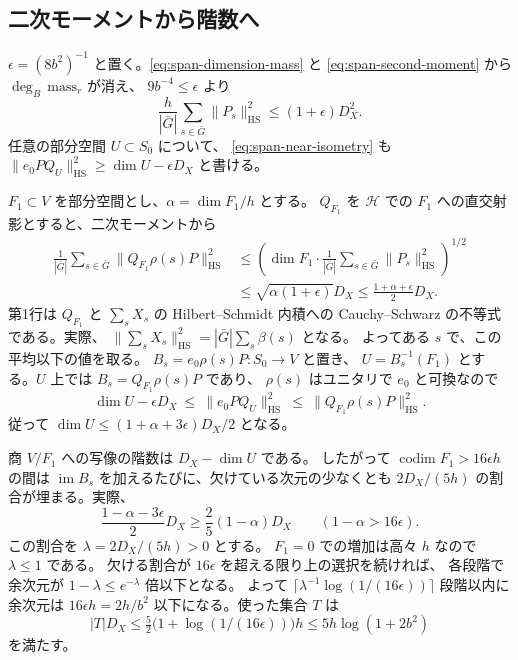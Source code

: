 \subsection{二次モーメントから階数へ}

\(\epsilon=(8b^2)^{-1}\) と置く。\eqref{eq:span-dimension-mass} と
\eqref{eq:span-second-moment} から \(\deg_B\,\mathrm{mass}_r\) が消え、
\(9b^{-4}\le\epsilon\) より
\begin{equation}\label{eq:span-moment-comparison}
 \frac{h}{|\bar G|}\sum_{s\in\bar G}\|P_s\|_{\mathrm{HS}}^2
    \leq (1+\epsilon)D_X^2 .
\end{equation}
任意の部分空間 \(U\subset S_0\) について、
\eqref{eq:span-near-isometry} も \(\|e_0P Q_U\|_{\mathrm{HS}}^2\geq\dim U-\epsilon D_X\)
と書ける。

\(F_1\subset V\) を部分空間とし、\(\alpha=\dim F_1/h\) とする。
\(Q_{F_1}\) を \(\mathcal H\) での \(F_1\) への直交射影とすると、二次モーメントから
\begin{align*}
 \frac1{|\bar G|}\sum_{s\in\bar G}\|Q_{F_1}\rho(s)P\|_{\mathrm{HS}}^2
 &\leq
 \left(\dim F_1\cdot
        \frac1{|\bar G|}\sum_{s\in\bar G}\|P_s\|_{\mathrm{HS}}^2\right)^{1/2}\\
 &\leq \sqrt{\alpha(1+\epsilon)}D_X
 \leq \frac{1+\alpha+\epsilon}{2}D_X.
\end{align*}
第1行は \(Q_{F_1}\) と \(\sum_s X_s\) の Hilbert--Schmidt 内積への
Cauchy--Schwarz の不等式である。実際、
\(\|\sum_s X_s\|_{\mathrm{HS}}^2=|\bar G|\sum_s\beta(s)\) となる。
よってある \(s\) で、この平均以下の値を取る。
\(B_s=e_0\rho(s)P\colon S_0\to V\) と置き、
\(U=B_s^{-1}(F_1)\) とする。\(U\) 上では \(B_s=Q_{F_1}\rho(s)P\) であり、
\(\rho(s)\) はユニタリで \(e_0\) と可換なので
\[
 \dim U-\epsilon D_X
 \ \leq\ \|e_0P Q_U\|_{\mathrm{HS}}^2
 \ \leq\ \|Q_{F_1}\rho(s)P\|_{\mathrm{HS}}^2 .
\]
従って \(\dim U\le(1+\alpha+3\epsilon)D_X/2\) となる。

商 \(V/F_1\) への写像の階数は \(D_X-\dim U\) である。
したがって \(\operatorname{codim}F_1>16\epsilon h\) の間は
\(\operatorname{im}B_s\) を加えるたびに、欠けている次元の少なくとも
\(2D_X/(5h)\) の割合が埋まる。実際、
\[
 \frac{1-\alpha-3\epsilon}{2}D_X
 \ge \frac25(1-\alpha)D_X
 \qquad (1-\alpha>16\epsilon).
\]
この割合を \(\lambda=2D_X/(5h)>0\) とする。
\(F_1=0\) での増加は高々 \(h\) なので \(\lambda\le1\) である。
欠ける割合が \(16\epsilon\) を超える限り上の選択を続ければ、
各段階で余次元が \(1-\lambda\le e^{-\lambda}\) 倍以下となる。
よって \(\lceil\lambda^{-1}\log(1/(16\epsilon))\rceil\) 段階以内に
余次元は \(16\epsilon h=2h/b^2\) 以下になる。使った集合 \(T\) は
\[
  |T|D_X\le\tfrac52\bigl(1+\log(1/(16\epsilon))\bigr)h
               \le 5h\log(1+2b^2)
\]
を満たす。

